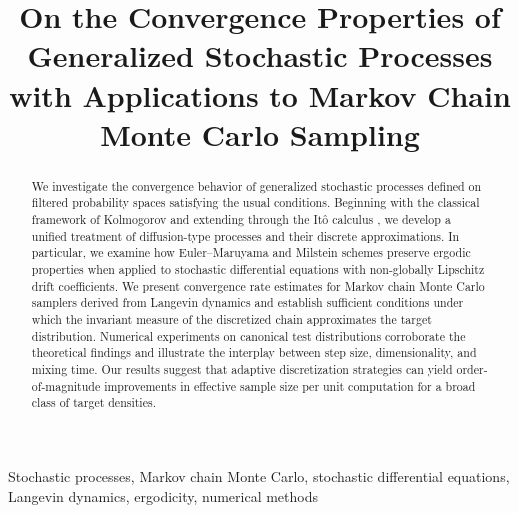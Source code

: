 \documentclass[journal]{IEEEtran}
\begin{document}
\title{On the Convergence Properties of Generalized Stochastic Processes with Applications to Markov Chain Monte Carlo Sampling}

\author{
}

\maketitle

\begin{abstract}
We investigate the convergence behavior of generalized stochastic processes defined on filtered probability spaces satisfying the usual conditions. Beginning with the classical framework of Kolmogorov \cite{kolmogorov1933} and extending through the It\^{o} calculus \cite{ito1951}, we develop a unified treatment of diffusion-type processes and their discrete approximations. In particular, we examine how Euler--Maruyama and Milstein schemes preserve ergodic properties when applied to stochastic differential equations with non-globally Lipschitz drift coefficients. We present convergence rate estimates for Markov chain Monte Carlo samplers derived from Langevin dynamics and establish sufficient conditions under which the invariant measure of the discretized chain approximates the target distribution. Numerical experiments on canonical test distributions corroborate the theoretical findings and illustrate the interplay between step size, dimensionality, and mixing time. Our results suggest that adaptive discretization strategies can yield order-of-magnitude improvements in effective sample size per unit computation for a broad class of target densities.
\end{abstract}

\begin{IEEEkeywords}
Stochastic processes, Markov chain Monte Carlo, stochastic differential equations, Langevin dynamics, ergodicity, numerical methods
\end{IEEEkeywords}
\end{document}
